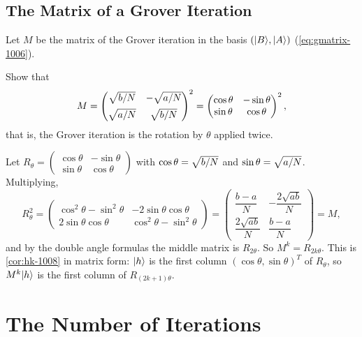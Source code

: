 \subsection{The Matrix of a Grover Iteration}

Let $M$ be the matrix of the Grover iteration in the basis $(\lvert B \rangle, \lvert A \rangle)$
(\cref{eq:gmatrix-1006}).

\begin{exercisebox}
\begin{exercise}\label{ex:msquare-1008}
    Show that
    \[M = \begin{pmatrix} \sqrt{b/N} & -\sqrt{a/N} \\[1ex] \sqrt{a/N} & \sqrt{b/N} \end{pmatrix}^{2}
        = \begin{pmatrix} \cos\theta & -\sin\theta \\ \sin\theta & \cos\theta \end{pmatrix}^{2},\]
    that is, the Grover iteration is the rotation by $\theta$ applied twice.
\end{exercise}
\tcblower
\begin{wsolution}
    Let $R_\theta = \left(\begin{smallmatrix} \cos\theta & -\sin\theta \\ \sin\theta & \cos\theta \end{smallmatrix}\right)$
    with $\cos\theta = \sqrt{b/N}$ and $\sin\theta = \sqrt{a/N}$. Multiplying,
    \[R_\theta^2
        = \begin{pmatrix} \cos^2\theta - \sin^2\theta & -2\sin\theta\cos\theta \\ 2\sin\theta\cos\theta & \cos^2\theta - \sin^2\theta \end{pmatrix}
        = \begin{pmatrix} \dfrac{b - a}{N} & -\dfrac{2\sqrt{ab}}{N} \\[2ex] \dfrac{2\sqrt{ab}}{N} & \dfrac{b - a}{N} \end{pmatrix} = M,\]
    and by the double angle formulas the middle matrix is $R_{2\theta}$. So $M^k = R_{2k\theta}$.
    This is \cref{cor:hk-1008} in matrix form: $\lvert h \rangle$ is the first column
    $(\cos\theta, \sin\theta)^T$ of $R_\theta$, so $M^k\lvert h \rangle$ is the first column of $R_{(2k+1)\theta}$.
\end{wsolution}
\end{exercisebox}

\section{The Number of Iterations}\label{sec:iterations-1008}

